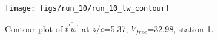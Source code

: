 \begin{figure}[H]
\centering
\texttt{[image: figs/run\_10/run\_10\_tw\_contour]}
\caption{Contour plot of $\overline{t^\prime w^\prime}$ at $z/c$=5.37, $V_{free}$=32.98, station 1.}
\label{fig:run_10_tw_contour}
\end{figure}


